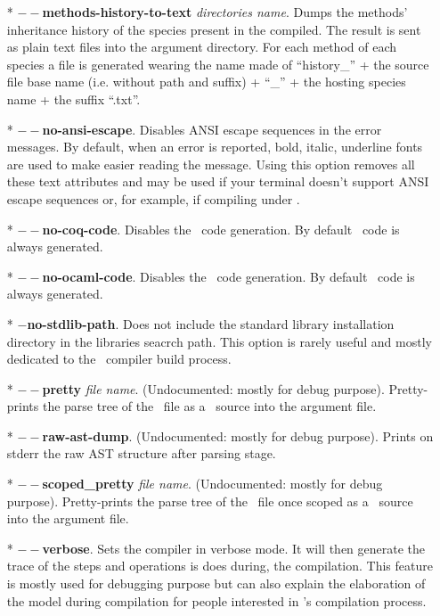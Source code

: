 \begin{itemize}
 \item[*] {\bf $--$methods-history-to-text} {\em directories
   name}. Dumps the methods' inheritance history of the species
   present in the compiled. The result is sent as plain text files
   into the argument directory. For each method of each species a file
   is generated wearing the name made of ``history\_'' + the source
   file base name (i.e. without path and suffix) + ``\_'' + the
   hosting species name + the suffix ``.txt''.

  \item[*] {\bf $--$no-ansi-escape}. Disables ANSI escape sequences in
    the error messages. By default, when an error is reported, bold,
    italic, underline fonts are used to make easier reading the
    message. Using this option removes all these text attributes and
    may be used if your terminal doesn't support ANSI escape sequences
    or, for example, if compiling under \emacs.

  \item[*] {\bf $--$no-coq-code}. Disables the \coq\ code
    generation. By default \coq\ code is always generated.

  \item[*] {\bf $--$no-ocaml-code}. Disables the \ocaml\ code
    generation. By default \ocaml\ code is always generated.

  \item[*] {\bf $-$no-stdlib-path}. Does not include the standard
    library installation directory in the libraries seacrch path. This
    option is rarely useful and mostly dedicated to the
    \focal\ compiler build process.

  \item[*] {\bf $--$pretty} {\em file name}. (Undocumented: mostly for
    debug purpose). Pretty-prints the parse tree of the \focal\ file
    as a \focal\ source into the argument file.

  \item[*] {\bf $--$raw-ast-dump}. (Undocumented: mostly for debug
    purpose). Prints on stderr the raw AST structure after parsing
    stage.

 \item[*] {\bf $--$scoped\_pretty} {\em file name}. (Undocumented:
   mostly for debug purpose). Pretty-prints the parse tree of the
   \focal\ file once scoped as a \focal\ source into the argument
   file.

  \item[*] {\bf $--$verbose}. Sets the compiler in verbose mode. It
    will then generate the trace of the steps and operations is does
    during, the compilation. This feature is mostly used for debugging
    purpose but can also explain the elaboration of the model during
    compilation for people interested in \focal's compilation
    process.


\end{itemize}
